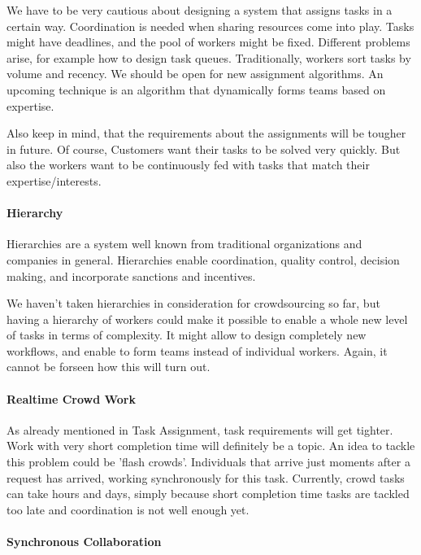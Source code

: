 \documentclass{sig-alternate}
\begin{document}
We have to be very cautious about designing a system that assigns tasks in a certain way. Coordination is needed when sharing resources come into play.
Tasks might have deadlines, and the pool of workers might be fixed. Different problems arise, for example how to design task queues. 
Traditionally, workers sort tasks by volume and recency. We should be open for new assignment algorithms. An upcoming technique is 
an algorithm that dynamically forms teams based on expertise. 

Also keep in mind, that the requirements about the assignments will be tougher in future. Of course, Customers want their tasks to be solved very quickly.
But also the workers want to be continuously fed with tasks that match their expertise/interests.

\paragraph{Hierarchy}

Hierarchies are a system well known from traditional organizations and companies in general. Hierarchies enable coordination, quality control, decision making, and incorporate sanctions and incentives.

We haven't taken hierarchies in consideration for crowdsourcing so far, but having a hierarchy of workers could make it possible to enable a whole new level of tasks in terms of complexity. It might allow to design completely new workflows, and enable to form teams instead of individual workers. Again, 
it cannot be forseen how this will turn out.

\paragraph{Realtime Crowd Work}

As already mentioned in Task Assignment, task requirements will get tighter. Work with very short completion time will definitely be a topic.
An idea to tackle this problem could be 'flash crowds'. Individuals that arrive just moments after a request has arrived, working synchronously for this task.
Currently, crowd tasks can take hours and days, simply because short completion time tasks are tackled too late and coordination is not well enough yet.

\paragraph{Synchronous Collaboration}
\end{document}
